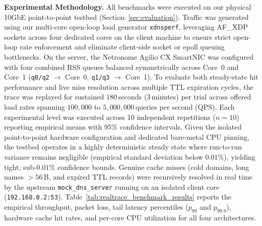 \documentclass[a4paper,fleqn,colorlinks,hidelinks]{cas-sc}
\begin{document}
\textbf{Experimental Methodology.} 
All benchmarks were executed on our physical 10GbE point-to-point testbed (Section~\ref{sec:evaluation}). Traffic was generated using our multi-core open-loop load generator \texttt{xdnsperf}, leveraging AF\_XDP sockets across four dedicated cores on the client machine to ensure strict open-loop rate enforcement and eliminate client-side socket or epoll queuing bottlenecks. On the server, the Netronome Agilio CX SmartNIC was configured with four combined RSS queues balanced symmetrically across Core~0 and Core~1 (\texttt{q0/q2} $\to$ Core~0, \texttt{q1/q3} $\to$ Core~1). To evaluate both steady-state hit performance and live miss resolution across multiple TTL expiration cycles, the trace was replayed for sustained $180$\,seconds ($3$\,minutes) per trial across offered load rates spanning $100{,}000$ to $5{,}000{,}000$\,queries per second (QPS). Each experimental level was executed across 10 independent repetitions ($n=10$) reporting empirical means with 95\% confidence intervals. Given the isolated point-to-point hardware configuration and dedicated bare-metal CPU pinning, the testbed operates in a highly deterministic steady state where run-to-run variance remains negligible (empirical standard deviation below $0.01\%$), yielding tight, sub-$0.01\%$ confidence bounds. Genuine cache misses (cold domains, long names $>56$\,B, and expired TTL records) were recursively resolved in real time by the upstream \texttt{mock\_dns\_server} running on an isolated client core (\texttt{192.168.0.2:53}). Table~\ref{tab:realtrace_benchmark_results} reports the empirical throughput, packet loss, tail latency percentiles ($p_{99}$ and $p_{99.9}$), hardware cache hit rates, and per-core CPU utilization for all four architectures.
\end{document}
